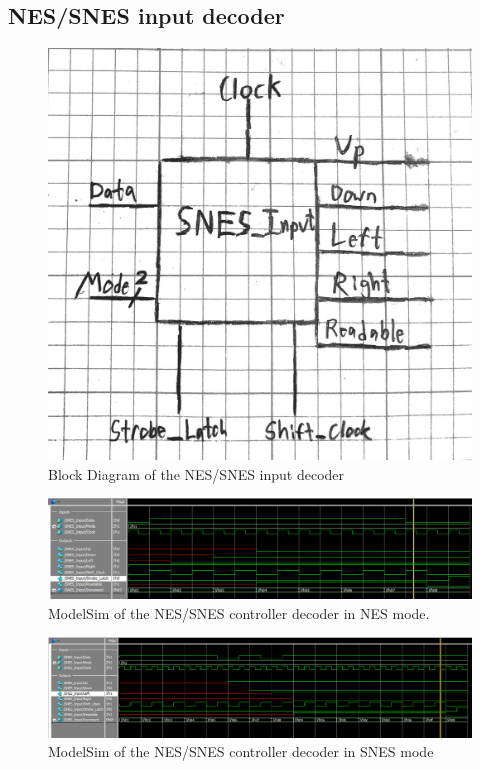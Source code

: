 \documentclass[]{article}
\begin{document}
\subsection{NES/SNES input decoder}
\begin{figure}[H]\centering
	\includegraphics[width=\linewidth]{figures/SNES_Input_Diagram}
	\caption{Block Diagram of the NES/SNES input decoder}
\end{figure}
\begin{figure}[H]\centering
	\includegraphics[width=\linewidth]{figures/NES_Input_Sim.png}
	\caption{ModelSim of the NES/SNES controller decoder in NES mode.}
\end{figure}

\begin{figure}[H]\centering
	\includegraphics[width=\linewidth]{figures/SNES_Input_ModelSim.png}
	\caption{ModelSim of the NES/SNES controller decoder in SNES mode}
\end{figure}
\end{document}
